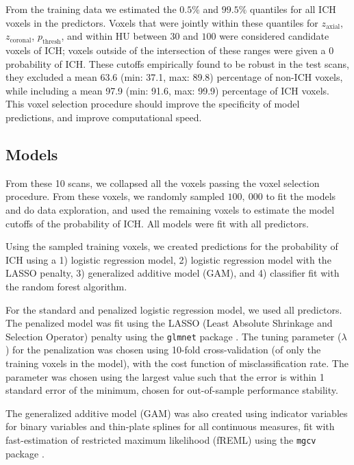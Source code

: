 \documentclass{elsarticle_nonatbib}\usepackage[]{graphicx}\usepackage[]{color}
\newcommand{\pkg}[1]{\texttt{#1}}
\begin{document}
From the training data we estimated the $0.5\%$ and $99.5\%$ quantiles for all ICH voxels in the predictors.  Voxels that were jointly within these quantiles for $z_{\text{axial}}$, $z_{\text{coronal}}$, $p_{\text{thresh}}$, and within HU between $30$ and $100$ were considered candidate voxels of ICH; voxels outside of the intersection of these ranges were given a $0$ probability of ICH. These cutoffs empirically found to be robust in the test scans, they excluded a mean 63.6 (min: 37.1, max: 89.8) percentage of non-ICH voxels, while including a mean 97.9 (min: 91.6, max: 99.9) percentage of ICH voxels.  This voxel selection procedure should improve the specificity of model predictions, and improve computational speed.  

\subsection{Models}

From these 10 scans, we collapsed all the voxels passing the voxel selection procedure.  From these voxels, we randomly sampled $100,~000$ to fit the models and do data exploration, and used the remaining voxels to estimate the model cutoffs of the probability of ICH.   All models were fit with all predictors.  


Using the sampled training voxels, we created predictions for the probability of ICH using a 1) logistic regression model, 2) logistic regression model with the LASSO  penalty, 3) generalized additive model (GAM), and 4) classifier fit with the random forest algorithm.

For the standard and penalized logistic regression model, we used all predictors.  The penalized model was fit using the LASSO (Least Absolute Shrinkage and Selection Operator) penalty \citep{tibshirani_regression_1996} using the \pkg{glmnet} package \citep{friedman_regularization_2010}.  The tuning parameter ($\lambda$) for the penalization was chosen using 10-fold cross-validation (of only the training voxels in the model), with the cost function of misclassification rate.  The parameter was chosen using the largest value such that the error is within 1 standard error of the minimum, chosen for out-of-sample performance stability.

The generalized additive model (GAM) \citep{hastie_generalized_1986, hastie_generalized_1990} was also created using indicator variables for binary variables and thin-plate splines for all continuous measures, fit with fast-estimation of restricted maximum likelihood (fREML) using the \pkg{mgcv} package \citep{wood_fast_2011, wood_generalized_2015}.  
\end{document}
